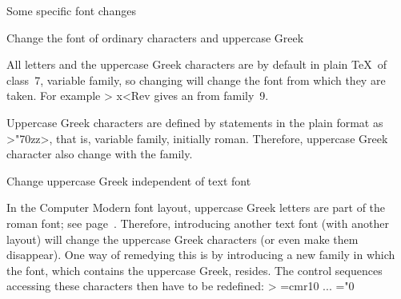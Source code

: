 \point Some specific font changes

\spoint Change the font of ordinary characters and uppercase Greek

All letters and the uppercase Greek characters are
by default in plain \TeX\ of class~7,
variable family, so changing  will change the font
from which they are taken.
For example
\Ver>{ x}<Rev  gives an  from family~9.

Uppercase Greek characters are defined by
 statements in the plain format as \ver>"70zz>,
that is, variable family, initially roman.
Therefore, uppercase Greek character also change with the family.

\spoint Change uppercase Greek independent of text font

In the Computer Modern font layout, uppercase Greek letters
are part of the roman font; see page~.
\alt
Therefore, introducing another
text font (with another layout)
will change the uppercase Greek characters
(or even make them disappear).
One way of remedying this is by introducing a new family in
which the  font, which contains the uppercase Greek,
resides.
The control sequences accessing these characters then have
to be redefined:
\Ver>
\newfam\Kgreek 
\textfont\Kgreek=cmr10 ...
\def\hex#1{\ifcase#10\or 1\or 2\or 3\or 4\or 5\or 6\or
    7\or 8\or 9\or A\or B\or C\or D\or E\or F\fi}
\mathchardef\Gamma="0\hex\Kgreek00 %
\mathchardef\Beta ="0\hex\Kgreek01 %
\mathchardef\Gamma ...<Rev
Note, by the way,
the absence of a either a space or a \cs{relax} token after
\n{\#1} in the definition of \cs{hex}. This implies that this
macro can only be called with an argument that is a 
control sequence.

\spoint Change the font of lowercase Greek 
       and mathematical symbols

Lowercase Greek characters have math code
\ver>"01zz>, meaning they are always from the math italic family. 
In order to change this one might redefine them,
for instance \ver.\mathchardef\alpha="710B., 
to make them variable family.
This is not done in plain \TeX, because the Computer Modern
roman font does not
have Greek lowercase, although it does have the uppercase characters.

Another way is to redefine them like \ver.\mathchardef\alpha="0n0B.
where \n{n} is the (hexadecimal) number of a family
compatible with math italic, containing for instance a bold
math italic font.


\point Assorted remarks

